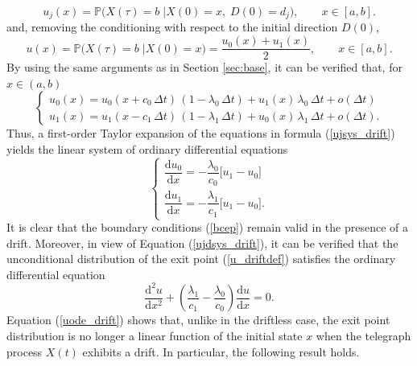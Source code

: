 \documentclass{article}
\begin{document}
$$u_j(x)=\mathbb{P}\Big(X(\tau)=b\;\Big\lvert X(0)=x,\; D(0)=d_j\Big),\qquad x\in[a,b].$$
and, removing the conditioning with respect to the initial direction $D(0)$,
\begin{equation}\label{u_driftdef}u(x)=\mathbb{P}\Big(X(\tau)=b\;\Big\lvert X(0)=x\Big)=\frac{u_0(x)+u_1(x)}{2},\qquad x\in[a,b].\end{equation}
By using the same arguments as in Section \ref{sec:base}, it can be verified that, for $x\in(a,b)$
\begin{equation}\label{ujsys_drift}
\begin{cases}
u_0(x)=u_0(x+c_0\,\Delta t)\,(1-\lambda_0\,\Delta t)+u_1(x)\,\lambda_0\,\Delta t + o(\Delta t)\\
u_1(x)=u_1(x-c_1\,\Delta t)\,(1-\lambda_1\,\Delta t)+u_0(x)\,\lambda_1\,\Delta t + o(\Delta t).
\end{cases}
\end{equation}
Thus, a first-order Taylor expansion of the equations in formula (\ref{ujsys_drift}) yields the linear system of ordinary differential equations
\begin{equation}\label{ujdsys_drift}
\begin{cases}
\dfrac{\mathrm{d} u_0}{\mathrm{d}x}=-\dfrac{\lambda_0}{c_0}\big[u_1-u_0\big]\\[0.75em]
\dfrac{\mathrm{d} u_1}{\mathrm{d}x}=-\dfrac{\lambda_1}{c_1}\big[u_1-u_0\big].
\end{cases}
\end{equation}
It is clear that the boundary conditions (\ref{bcep}) remain valid in the presence of a drift. Moreover, in view of Equation (\ref{ujdsys_drift}), it can be verified that the unconditional distribution of the exit point (\ref{u_driftdef}) satisfies the ordinary differential equation \begin{equation}\label{uode_drift}\dfrac{\mathrm{d}^2 u}{\mathrm{d}x^2}+\left(\frac{\lambda_1}{c_1}-\frac{\lambda_0}{c_0}\right)\dfrac{\mathrm{d} u}{\mathrm{d}x}=0.\end{equation}
Equation (\ref{uode_drift}) shows that, unlike in the driftless case, the exit point distribution is no longer a linear function of the initial state $x$ when the telegraph process $X(t)$ exhibits a drift. In particular, the following result holds.
\end{document}
